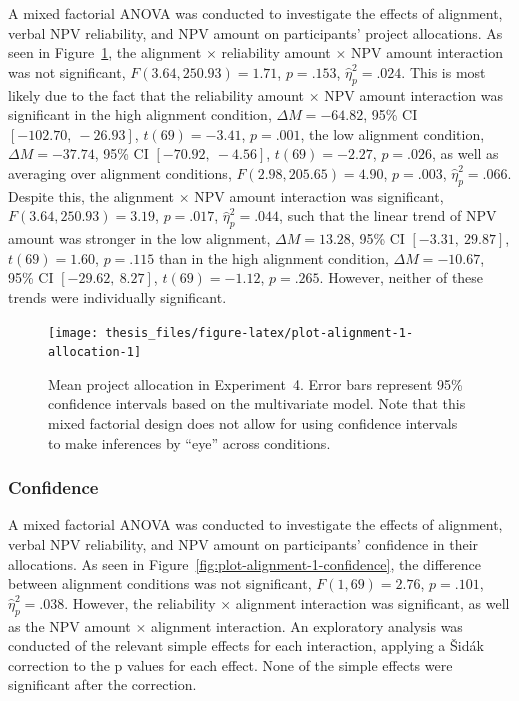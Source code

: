 \documentclass[a4paper, nobind, dvipsnames]{templates/ociamthesis}
\theoremstyle{definition}
\theoremstyle{definition}
\theoremstyle{definition}
\theoremstyle{definition}
\theoremstyle{remark}
\begin{document}
A mixed factorial ANOVA was conducted to investigate the effects of alignment,
verbal NPV reliability, and NPV amount on participants' project allocations. As
seen in Figure~\ref{fig:plot-alignment-1-allocation}, the alignment \(\times\)
reliability amount \(\times\) NPV amount interaction was not significant,
\(F(3.64, 250.93) = 1.71\), \(p = .153\), \(\hat{\eta}^2_p = .024\). This
is most likely due to the fact that the reliability amount \(\times\) NPV amount
interaction was significant in the high alignment condition,
\(\Delta M = -64.82\), 95\% CI \([-102.70,~-26.93]\), \(t(69) = -3.41\), \(p = .001\), the low alignment
condition, \(\Delta M = -37.74\), 95\% CI \([-70.92,~-4.56]\), \(t(69) = -2.27\), \(p = .026\), as well as
averaging over alignment conditions,
\(F(2.98, 205.65) = 4.90\), \(p = .003\), \(\hat{\eta}^2_p = .066\). Despite this,
the alignment \(\times\) NPV amount interaction was significant,
\(F(3.64, 250.93) = 3.19\), \(p = .017\), \(\hat{\eta}^2_p = .044\), such that the linear
trend of NPV amount was stronger in the low alignment,
\(\Delta M = 13.28\), 95\% CI \([-3.31,~29.87]\), \(t(69) = 1.60\), \(p = .115\) than in the high alignment
condition, \(\Delta M = -10.67\), 95\% CI \([-29.62,~8.27]\), \(t(69) = -1.12\), \(p = .265\). However, neither of
these trends were individually significant.



\begin{figure}
\texttt{[image: thesis\_files/figure-latex/plot-alignment-1-allocation-1]} \caption{Mean project allocation in Experiment~4. Error bars represent 95\% confidence intervals based on the multivariate model. Note that this mixed factorial design does not allow for using confidence intervals to make inferences by ``eye'' across conditions.}\label{fig:plot-alignment-1-allocation}
\end{figure}

\subsubsection{Confidence}

A mixed factorial ANOVA was conducted to investigate the effects of alignment,
verbal NPV reliability, and NPV amount on participants' confidence in their
allocations. As seen in Figure~\ref{fig:plot-alignment-1-confidence}, the
difference between alignment conditions was not significant,
\(F(1, 69) = 2.76\), \(p = .101\), \(\hat{\eta}^2_p = .038\). However, the reliability \(\times\)
alignment interaction was significant, as well as the NPV amount \(\times\)
alignment interaction. An exploratory analysis was conducted of the relevant
simple effects for each interaction, applying a Šidák correction to the p values
for each effect. None of the simple effects were significant after the
correction.
\end{document}
